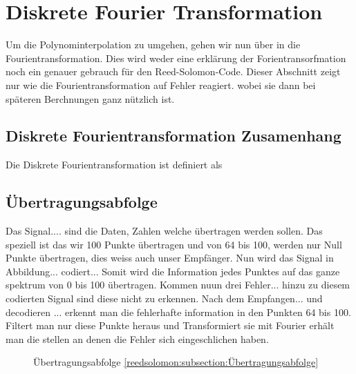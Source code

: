 %
%
%
\section{Diskrete Fourier Transformation
\label{reedsolomon:section:dtf}}
Um die Polynominterpolation zu umgehen, gehen wir nun über in die Fourientransformation.
Dies wird weder eine erklärung der Forientransorfmation noch ein genauer gebrauch
für den Reed-Solomon-Code. Dieser Abschnitt zeigt nur wie die Fourientransformation auf Fehler reagiert.
wobei sie dann bei späteren Berchnungen ganz nützlich ist.

\subsection{Diskrete Fourientransformation Zusamenhang
\label{reedsolomon:subsection:dtfzusamenhang}}
Die Diskrete Fourientransformation ist definiert als

\subsection{Übertragungsabfolge
\label{reedsolomon:subsection:Übertragungsabfolge}}
Das Signal.... sind die Daten, Zahlen welche übertragen werden sollen.
Das speziell ist das wir 100 Punkte übertragen und von 64 bis 100,
werden nur Null Punkte übertragen, dies weiss auch unser Empfänger.
Nun wird das Signal in Abbildung... codiert...
Somit wird die Information jedes Punktes auf das ganze spektrum von 0 bis 100 übertragen.
Kommen nuun drei Fehler... hinzu zu diesem codierten Signal sind diese nicht zu erkennen.
Nach dem Empfangen... und decodieren ... erkennt man die fehlerhafte information in den Punkten 64 bis 100.
Filtert man nur diese Punkte heraus und Transformiert sie mit Fourier erhält man die stellen an denen die Fehler sich eingeschlichen haben.

\begin{figure}
	\centering
    
	\caption{Übertragungsabfolge \ref{reedsolomon:subsection:Übertragungsabfolge}}
	\label{fig:sendorder}
\end{figure}